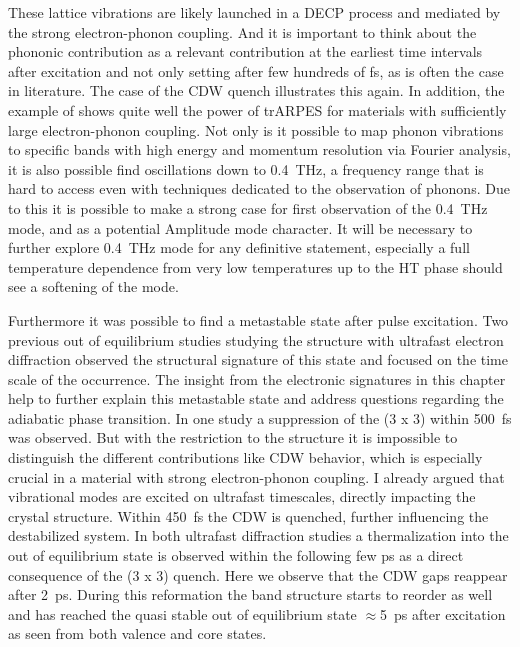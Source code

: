 These lattice vibrations are likely launched in a DECP process and mediated by the strong electron-phonon coupling.
And it is important to think about the phononic contribution as a relevant contribution at the earliest time intervals after excitation and not only setting after few hundreds of \unit{\femto\second}, as is often the case in literature.
The case of the CDW quench illustrates this again.
In addition, the example of  shows quite well the power of trARPES for materials with sufficiently large electron-phonon coupling.
Not only is it possible to map phonon vibrations to specific bands with high energy and momentum resolution via Fourier analysis, it is also possible find oscillations down to \qty{0.4}{\tera\hertz}, a frequency range that is hard to access even with techniques dedicated to the observation of phonons.
Due to this it is possible to make a strong case for first observation of the \qty{0.4}{\tera\hertz} mode, and as a potential Amplitude mode character.
It will be necessary to further explore \qty{0.4}{\tera\hertz} mode for any definitive statement, especially a full temperature dependence from very low temperatures up to the HT phase should see a softening of the mode.

Furthermore it was possible to find a metastable state after pulse excitation.
Two previous out of equilibrium studies studying the structure with ultrafast electron diffraction observed the structural signature of this state and focused on the time scale of the occurrence.
The insight from the electronic signatures in this chapter help to further explain this metastable state and address questions regarding the adiabatic phase transition.
In one study \cite{domrose_femtosecond_2024} a suppression of the (3 x 3) within \qty{500}{\femto\second} was observed.
But with the restriction to the structure it is impossible to distinguish the different contributions like CDW behavior, which is especially crucial in a material with strong electron-phonon coupling.
I already argued that vibrational modes are excited on ultrafast timescales, directly impacting the crystal structure.
Within \qty{450}{\femto\second} the CDW is quenched, further influencing the destabilized system.
In both ultrafast diffraction studies a thermalization into the out of equilibrium state is observed within the following few \unit{\pico\second} as a direct consequence of the (3 x 3) quench.
Here we observe that the CDW gaps reappear after \qty{2}{\pico\second}.
During this reformation the band structure starts to reorder as well and has reached the quasi stable out of equilibrium state $\approx$\qty{5}{\pico\second} after excitation as seen from both valence and core states.

